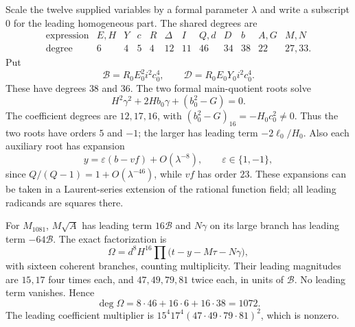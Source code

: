 Scale the twelve supplied variables by a formal parameter $\lambda$ and
write a subscript $0$ for the leading homogeneous part. The shared degrees
are
\[
 \begin{array}{c|rrrrrrrrrrr}
 \text{expression}&E,H&Y&c&R&\Delta&I&Q,d&D&b&A,G&M,N\\
 \hline
 \text{degree}&6&4&5&4&12&11&46&34&38&22&27,33.
 \end{array}
\]
Put
\[
 \mathcal B=R_0E_0^2i^2c_0^4,\qquad
 \mathcal D=R_0E_0Y_0i^2c_0^4.
\]
These have degrees $38$ and $36$.
The two formal main-quotient roots solve
\[
 H^2\gamma^2+2Hb_0\gamma+(b_0^2-G)=0.
\]
The coefficient degrees are $12,17,16$, with
$(b_0^2-G)_{16}=-H_0c_0^2\ne0$. Thus the two roots have orders $5$ and
$-1$; the larger has leading term $-2\ell_0/H_0$.
Also each auxiliary root has expansion
\[
 y=\varepsilon(b-vf)+O(\lambda^{-8}),\qquad \varepsilon\in\{1,-1\},
\]
since $Q/(Q-1)=1+O(\lambda^{-46})$, while $vf$ has order $23$.
These expansions can be taken in a Laurent-series extension of the
rational function field; all leading radicands are squares there.

For $M_{1081}$, $M\sqrt A$ has leading term $16\mathcal B$ and
$N\gamma$ on its large branch has leading term $-64\mathcal B$.
The exact factorization is
\begin{equation}
 \Omega=d^8H^{16}
  \prod\bigl(t-y-M\tau-N\gamma\bigr),
 \label{eq:16factor}
\end{equation}
with sixteen coherent branches, counting multiplicity. Their leading
magnitudes are $15,17$ four times each, and $47,49,79,81$ twice each,
in units of $\mathcal B$. No leading term vanishes. Hence
\[
 \deg\Omega=8\cdot46+16\cdot6+16\cdot38=1072.
\]
The leading coefficient multiplier is
$15^4 17^4(47\cdot49\cdot79\cdot81)^2$, which is nonzero.

